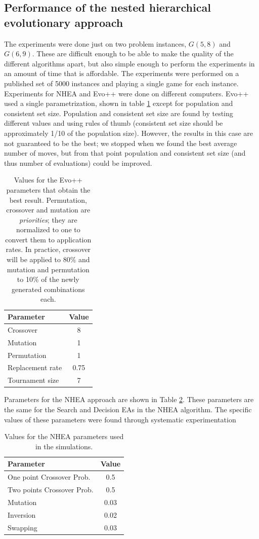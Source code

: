 \subsection{Performance of the nested hierarchical evolutionary approach}

The experiments were done just on two problem instances, $G(5,8)$ and $G(6,9)$. These are difficult enough to be able
to make the quality of the different algorithms apart, but also simple
enough to perform the experiments in an amount of time that is
affordable. The experiments were performed on a published set of 5000
instances and playing a single game for each instance. Experiments
for NHEA and Evo++ were done on different computers. Evo++ used a single
parametrization, shown in table \ref{tab:params} except for population
and consistent set size. Population and consistent set size are found
by testing different values and using rules of thumb (consistent set
size should be approximately 1/10 of the population size). However, the
results in this case are not guaranteed to be the best; we stopped
when we found the best average number of moves, but from that point
population and consistent set size (and thus number of evaluations)
could be improved.

\begin{table}[!ht]
\centering
\caption{Values for the Evo++ parameters that obtain the best
  result. Permutation, crossover and mutation are {\em priorities};
  they are normalized to one to convert them to application rates. In
  practice, crossover will be applied to 80\% and mutation and
  permutation to 10\% of the newly generated combinations each. \label{tab:params}}
\begin{tabular}{lc}
\hline
Parameter & Value \\
\hline 
Crossover  & 8 \\
Mutation  & 1 \\
Permutation  & 1 \\
Replacement rate  & 0.75 \\
Tournament size & 7 \\
\hline
\end{tabular}
\end{table}
%

Parameters for the NHEA approach are shown in Table \ref{tab:paramsBS}. These parameters are the same for the
Search and Decision EAs in the NHEA algorithm. The specific values of
these parameters were found through systematic experimentation


\begin{table}[!ht]
\centering
\caption{Values for the NHEA parameters used in the simulations. \label{tab:paramsBS}}
\begin{tabular}{lc}
\hline
Parameter & Value \\
\hline 
One point Crossover Prob.  & 0.5 \\
Two points Crossover Prob. & 0.5 \\
Mutation  & 0.03 \\
Inversion  & 0.02 \\
Swapping & 0.03 \\
\hline
\end{tabular}
\end{table}

